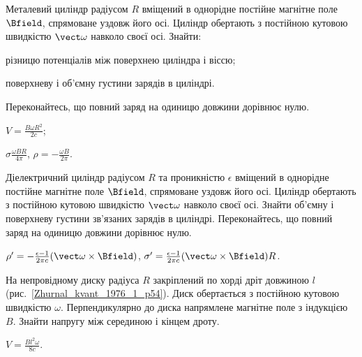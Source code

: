 \begin{problem}
Металевий циліндр радіусом $R$ вміщений в однорідне постійне магнітне поле $\Bfield$, спрямоване уздовж його осі. Циліндр обертають з постійною кутовою швидкістю $\vect\omega$ навколо своєї осі. Знайти:
\begin{enumerate*}[label=\alph*)]
	\item різницю потенціалів між поверхнею циліндра і віссю;
	\item поверхневу і об'ємну  густини зарядів в циліндрі.
\end{enumerate*}
Переконайтесь, що повний заряд на одиницю довжини дорівнює нулю.
\begin{solution}
	\begin{enumerate*}[label=\alph*)]
		\item $V = \frac{B\omega R^2}{2c}$;
		\item $\sigma \frac{\omega B R}{4\pi}$, $\rho = -\frac{\omega B}{2\pi}$.
	\end{enumerate*}
\end{solution}
\end{problem}

\begin{problem}
Діелектричний циліндр радіусом $R$ та проникністю $\epsilon$ вміщений в однорідне постійне магнітне поле $\Bfield$, спрямоване уздовж його осі. Циліндр обертають з постійною кутовою швидкістю $\vect\omega$ навколо своєї осі. Знайти об'ємну і поверхневу густини зв'язаних зарядів в циліндрі. Переконайтесь, що повний заряд на одиницю довжини дорівнює нулю.
\begin{solution}
		$\rho' = -\frac{\epsilon - 1}{2\pi c} (\vect\omega\times\Bfield)$, $\sigma' = \frac{\epsilon - 1}{2\pi c} (\vect\omega\times\Bfield)R$.
\end{solution}
\end{problem}

\begin{problem}\label{prb:Zhurnal_kvant_1976_1_p54}
    На непровідному диску радіуса $R$ закріплений по хорді дріт довжиною $l$ (рис.~\ref{Zhurnal_kvant_1976_1_p54}). Диск обертається з постійною кутовою швидкістю $\omega$. Перпендикулярно до диска напрямлене магнітне поле з індукцією $B$. Знайти напругу між серединою і кінцем дроту.
\begin{solution}
	$V = \frac{Bl^2\omega}{8c}$.
\end{solution}
\end{problem}

